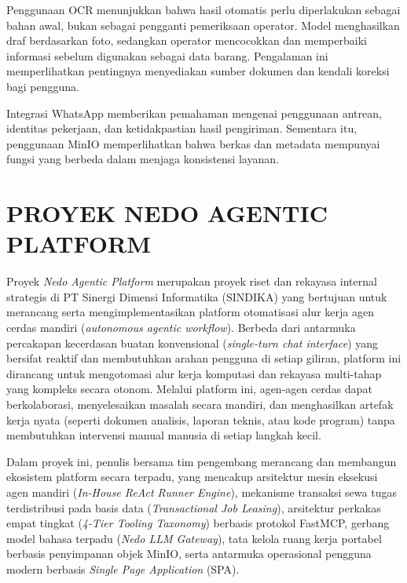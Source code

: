 Penggunaan OCR menunjukkan bahwa hasil otomatis perlu diperlakukan sebagai bahan awal, bukan sebagai pengganti pemeriksaan operator. Model menghasilkan draf berdasarkan foto, sedangkan operator mencocokkan dan memperbaiki informasi sebelum digunakan sebagai data barang. Pengalaman ini memperlihatkan pentingnya menyediakan sumber dokumen dan kendali koreksi bagi pengguna.

Integrasi WhatsApp memberikan pemahaman mengenai penggunaan antrean, identitas pekerjaan, dan ketidakpastian hasil pengiriman. Sementara itu, penggunaan MinIO memperlihatkan bahwa berkas dan metadata mempunyai fungsi yang berbeda dalam menjaga konsistensi layanan.


\section{PROYEK NEDO AGENTIC PLATFORM}

Proyek \textit{Nedo Agentic Platform} merupakan proyek riset dan rekayasa internal strategis di PT Sinergi Dimensi Informatika (SINDIKA) yang bertujuan untuk merancang serta mengimplementasikan platform otomatisasi alur kerja agen cerdas mandiri (\textit{autonomous agentic workflow}). Berbeda dari antarmuka percakapan kecerdasan buatan konvensional (\textit{single-turn chat interface}) yang bersifat reaktif dan membutuhkan arahan pengguna di setiap giliran, platform ini dirancang untuk mengotomasi alur kerja komputasi dan rekayasa multi-tahap yang kompleks secara otonom. Melalui platform ini, agen-agen cerdas dapat berkolaborasi, menyelesaikan masalah secara mandiri, dan menghasilkan artefak kerja nyata (seperti dokumen analisis, laporan teknis, atau kode program) tanpa membutuhkan intervensi manual manusia di setiap langkah kecil.

Dalam proyek ini, penulis bersama tim pengembang merancang dan membangun ekosistem platform secara terpadu, yang mencakup arsitektur mesin eksekusi agen mandiri (\textit{In-House ReAct Runner Engine}), mekanisme transaksi sewa tugas terdistribusi pada basis data (\textit{Transactional Job Leasing}), arsitektur perkakas empat tingkat (\textit{4-Tier Tooling Taxonomy}) berbasis protokol FastMCP, gerbang model bahasa terpadu (\textit{Nedo LLM Gateway}), tata kelola ruang kerja portabel berbasis penyimpanan objek MinIO, serta antarmuka operasional pengguna modern berbasis \textit{Single Page Application} (SPA).

